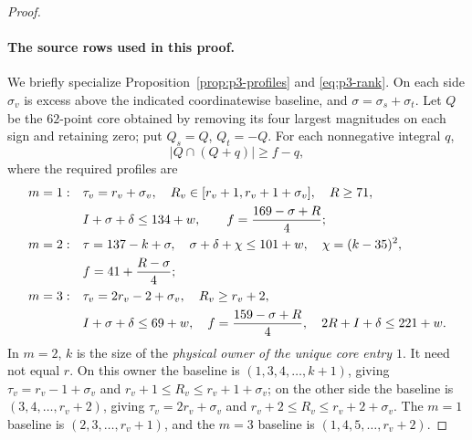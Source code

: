 \documentclass[11pt,letterpaper]{article}
\theoremstyle{definition}\newtheorem{definition}[theorem]{Definition}
\begin{document}
\begin{proof}
\paragraph{The source rows used in this proof.}
We briefly specialize Proposition~\ref{prop:p3-profiles} and
\eqref{eq:p3-rank}. On each side $\sigma_v$ is excess above the
indicated coordinatewise baseline, and $\sigma=\sigma_s+\sigma_t$.
Let $Q$ be the $62$-point core obtained by removing its four largest
magnitudes on each sign and retaining zero; put $Q_s=Q$, $Q_t=-Q$.
For each nonnegative integral $q$,
\begin{equation}\label{eq:p3-a1-overlap}
 |Q\cap(Q+q)|\ge f-q,
\end{equation}
where the required profiles are
\begin{align}
 m=1:\quad &\tau_v=r_v+\sigma_v,\quad
 R_v\in[r_v+1,r_v+1+\sigma_v],\quad R\ge71,\notag\\
 &I+\sigma+\delta\le134+w,\qquad
 f=\frac{169-\sigma+R}{4};\label{eq:p3-a1-profile1}\\
 m=2:\quad &\tau=137-k+\sigma,\quad
 \sigma+\delta+\chi\le101+w,\quad \chi=(k-35)^2,\notag\\
 &f=41+\frac{R-\sigma}{4};\label{eq:p3-a1-profile2}\\
 m=3:\quad &\tau_v=2r_v-2+\sigma_v,\quad R_v\ge r_v+2,\notag\\
 &I+\sigma+\delta\le69+w,\quad
 f=\frac{159-\sigma+R}{4},\quad 2R+I+\delta\le221+w.
 \label{eq:p3-a1-profile3}
\end{align}
In $m=2$, $k$ is the size of the \emph{physical owner of the unique
core entry $1$}. It need not equal $r$. On this owner the baseline is
$(1,3,4,\ldots,k+1)$, giving $\tau_v=r_v-1+\sigma_v$ and
$r_v+1\le R_v\le r_v+1+\sigma_v$; on the other side the baseline is
$(3,4,\ldots,r_v+2)$, giving $\tau_v=2r_v+\sigma_v$ and
$r_v+2\le R_v\le r_v+2+\sigma_v$.
The $m=1$ baseline is $(2,3,\ldots,r_v+1)$, and the $m=3$ baseline
is $(1,4,5,\ldots,r_v+2)$. 


\end{proof}
\end{document}
